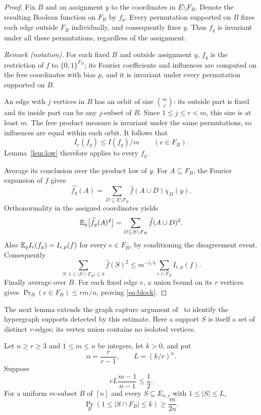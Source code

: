 \begin{proof}
Fix $B$ and an assignment $y$ to the coordinates in $E\setminus F_B$.
Denote the resulting Boolean function on $F_B$ by $f_y$.
Every permutation supported on $B$ fixes each edge outside $F_B$
individually, and consequently fixes $y$. Thus $f_y$ is invariant
under all these permutations, regardless of the assignment.

\noindent\textit{Remark (notation).} For each fixed $B$ and outside assignment $y$, $f_y$ is the restriction of $f$ to $\{0,1\}^{F_B}$; its Fourier coefficients and influences are computed on the free coordinates with bias $p$, and it is invariant under every permutation supported on $B$.


An edge with $j$ vertices in $B$ has an orbit of size $\binom mj$:
its outside part is fixed and its inside part can be any $j$-subset
of $B$. Since $1\le j\le r<m$, this size is at least $m$.
The free product measure is invariant under the same permutations,
so influences are equal within each orbit. It follows that
\[
 I_e(f_y)\le I(f_y)/m\qquad(e\in F_B).
\]
Lemma~\ref{lem:low} therefore applies to every $f_y$.

Average its conclusion over the product law of $y$. For $A\subseteq F_B$,
the Fourier expansion of $f$ gives
\[
 \widehat{f_y}(A)=
 \sum_{D\subseteq E\setminus F_B}\widehat f(A\cup D)\chi_D(y).
\]
Orthonormality in the assigned coordinates yields
\[
 \mathbb E_y\bigl[\widehat{f_y}(A)^2\bigr]
 =\sum_{D\subseteq E\setminus F_B}\widehat f(A\cup D)^2.
\]
Also $\mathbb E_y I_e(f_y)=I_{e,p}(f)$ for every $e\in F_B$, by
conditioning the disagreement event. Consequently
\[
 \sum_{S:\,1\le|S\cap F_B|\le k}\widehat f(S)^2
 \le m^{-1/4}\sum_{e\in F_B}I_{e,p}(f).
\]
Finally average over $B$. For each fixed edge $e$, a union bound on
its $r$ vertices gives $\Pr_B(e\in F_B)\le rm/n$, proving
\eqref{eq:block}.
\end{proof}

The next lemma extends the graph capture argument
of~\cite[Lemma~3.3]{Graph2026} to identify the hypergraph supports
detected by this estimate. Here a support $S$ is itself a set of distinct $r$-edges;
its vertex union contains no isolated vertices.

\begin{lemma}\label{lem:capture}
Let $n\ge r\ge3$ and $1\le m\le n$ be integers, let $k>0$, and put
\[
 \alpha=\frac r{r-1},\qquad L=(k/r)^\alpha.
\]
Suppose
\begin{equation}\label{eq:capture-condition}
 rL\frac{m-1}{n-1}\le\frac12.
\end{equation}
For a uniform $m$-subset $B$ of $[n]$ and every
$S\subseteq E_{n,r}$ with $1\le|S|\le L$,
\begin{equation}\label{eq:capture}
 \Pr_B(1\le|S\cap F_B|\le k)\ge\frac{m}{2n}.
\end{equation}
\end{lemma}

